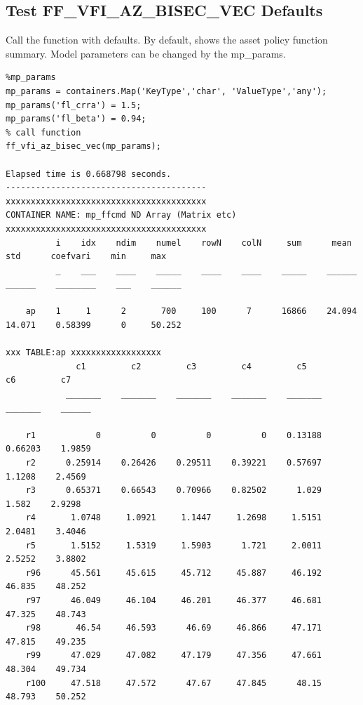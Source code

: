 \documentclass[
]{book}
\begin{document}
\hypertarget{test-ff_vfi_az_bisec_vec-defaults}{%
\subsection{Test FF\_VFI\_AZ\_BISEC\_VEC Defaults}\label{test-ff_vfi_az_bisec_vec-defaults}}

Call the function with defaults. By default, shows the asset policy
function summary. Model parameters can be changed by the mp\_params.

\begin{verbatim}
%mp_params
mp_params = containers.Map('KeyType','char', 'ValueType','any');
mp_params('fl_crra') = 1.5;
mp_params('fl_beta') = 0.94;
% call function
ff_vfi_az_bisec_vec(mp_params);

Elapsed time is 0.668798 seconds.
----------------------------------------
xxxxxxxxxxxxxxxxxxxxxxxxxxxxxxxxxxxxxxxx
CONTAINER NAME: mp_ffcmd ND Array (Matrix etc)
xxxxxxxxxxxxxxxxxxxxxxxxxxxxxxxxxxxxxxxx
          i    idx    ndim    numel    rowN    colN     sum      mean      std      coefvari    min     max  
          _    ___    ____    _____    ____    ____    _____    ______    ______    ________    ___    ______

    ap    1     1      2       700     100      7      16866    24.094    14.071    0.58399      0     50.252

xxx TABLE:ap xxxxxxxxxxxxxxxxxx
              c1         c2         c3         c4         c5         c6         c7  
            _______    _______    _______    _______    _______    _______    ______

    r1            0          0          0          0    0.13188    0.66203    1.9859
    r2      0.25914    0.26426    0.29511    0.39221    0.57697     1.1208    2.4569
    r3      0.65371    0.66543    0.70966    0.82502      1.029      1.582    2.9298
    r4       1.0748     1.0921     1.1447     1.2698     1.5151     2.0481    3.4046
    r5       1.5152     1.5319     1.5903      1.721     2.0011     2.5252    3.8802
    r96      45.561     45.615     45.712     45.887     46.192     46.835    48.252
    r97      46.049     46.104     46.201     46.377     46.681     47.325    48.743
    r98       46.54     46.593      46.69     46.866     47.171     47.815    49.235
    r99      47.029     47.082     47.179     47.356     47.661     48.304    49.734
    r100     47.518     47.572      47.67     47.845      48.15     48.793    50.252
\end{verbatim}
\end{document}
